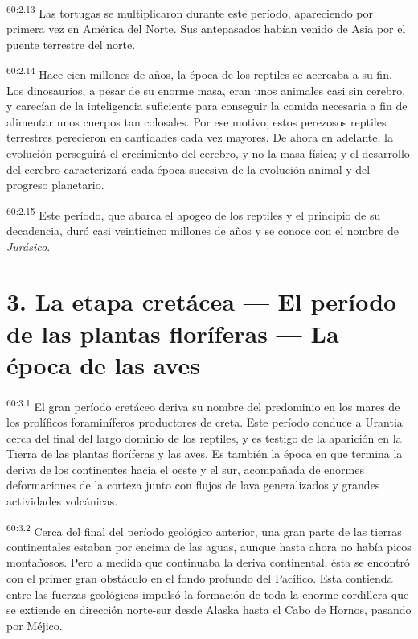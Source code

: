 \par
\textsuperscript{60:2.13} Las tortugas se multiplicaron durante este período, apareciendo por primera vez en América del Norte. Sus antepasados habían venido de Asia por el puente terrestre del norte.

\par
\textsuperscript{60:2.14} Hace cien millones de años, la época de los reptiles se acercaba a su fin. Los dinosaurios, a pesar de su enorme masa, eran unos animales casi sin cerebro, y carecían de la inteligencia suficiente para conseguir la comida necesaria a fin de alimentar unos cuerpos tan colosales. Por ese motivo, estos perezosos reptiles terrestres perecieron en cantidades cada vez mayores. De ahora en adelante, la evolución perseguirá el crecimiento del cerebro, y no la masa física; y el desarrollo del cerebro caracterizará cada época sucesiva de la evolución animal y del progreso planetario.

\par
\textsuperscript{60:2.15} Este período, que abarca el apogeo de los reptiles y el principio de su decadencia, duró casi veinticinco millones de años y se conoce con el nombre de \textit{Jurásico}.

\section*{3. La etapa cretácea --- El período de las plantas floríferas --- La época de las aves}
\par
\textsuperscript{60:3.1} El gran período cretáceo deriva su nombre del predominio en los mares de los prolíficos foraminíferos productores de creta. Este período conduce a Urantia cerca del final del largo dominio de los reptiles, y es testigo de la aparición en la Tierra de las plantas floríferas y las aves. Es también la época en que termina la deriva de los continentes hacia el oeste y el sur, acompañada de enormes deformaciones de la corteza junto con flujos de lava generalizados y grandes actividades volcánicas.

\par
\textsuperscript{60:3.2} Cerca del final del período geológico anterior, una gran parte de las tierras continentales estaban por encima de las aguas, aunque hasta ahora no había picos montañosos. Pero a medida que continuaba la deriva continental, ésta se encontró con el primer gran obstáculo en el fondo profundo del Pacífico. Esta contienda entre las fuerzas geológicas impulsó la formación de toda la enorme cordillera que se extiende en dirección norte-sur desde Alaska hasta el Cabo de Hornos, pasando por Méjico.

